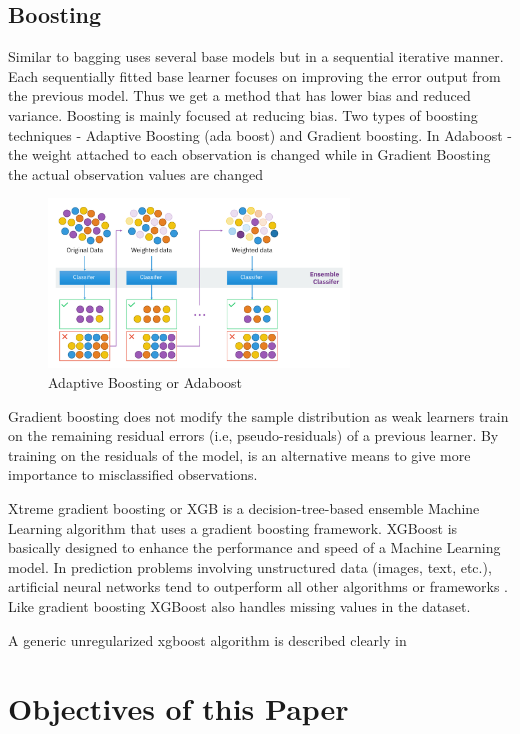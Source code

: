 \documentclass{article}
\begin{document}
\subsection{Boosting}


Similar to bagging uses several base models but in a sequential iterative manner. Each sequentially fitted base learner focuses on improving the error output from the previous model. Thus we get a method that has lower bias and reduced variance.
Boosting is mainly focused at reducing bias. Two types of boosting techniques - Adaptive Boosting (ada boost) and Gradient boosting.
In Adaboost - the weight attached to each observation is changed while in Gradient Boosting the actual observation values are changed

\begin{figure}[H]
    \centering
    \includegraphics[width=8cm]{report-imgs/adaboost.png}
    \caption{Adaptive Boosting or Adaboost \cite{wikiEnsemble}}
    \label{adaboost}
\end{figure}

Gradient boosting does not modify the sample distribution as weak learners train on the remaining residual errors  (i.e, pseudo-residuals) of a previous learner. By training on the residuals of the model, is an alternative means to give more importance to misclassified observations.



Xtreme gradient boosting or XGB is a decision-tree-based ensemble Machine Learning algorithm that uses a gradient boosting framework. XGBoost is basically designed to enhance the performance and speed of a Machine Learning model. In prediction problems involving unstructured data (images, text, etc.), artificial neural networks tend to outperform all other algorithms or frameworks \cite{mujtaba_2021}. Like gradient boosting XGBoost also handles missing values in the dataset.  

A generic unregularized xgboost algorithm is described clearly in \cite{enwiki:1035329027}

\section{Objectives of this Paper}
\end{document}
